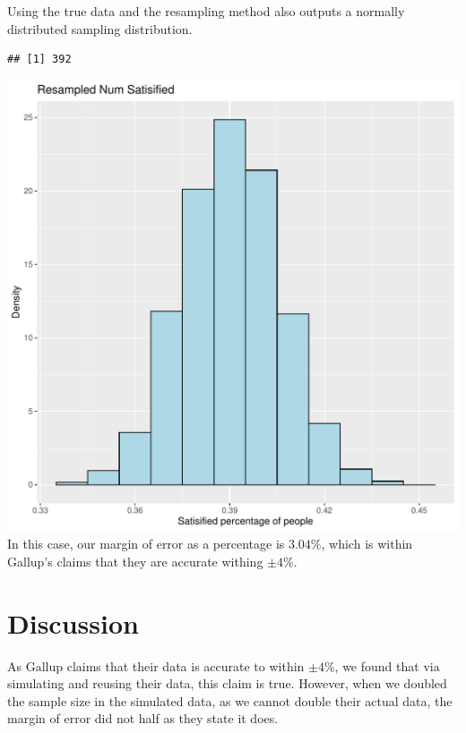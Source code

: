 \documentclass{article}\usepackage[]{graphicx}\usepackage[]{xcolor}
\makeatletter
\def\maxwidth{ %
  \ifdim\Gin@nat@width>\linewidth
    \linewidth
  \else
    \Gin@nat@width
  \fi
}
\newenvironment{kframe}{%
 \def\at@end@of@kframe{}%
 \ifinner\ifhmode%
  \def\at@end@of@kframe{\end{minipage}}%
  \begin{minipage}{\columnwidth}%
 \fi\fi%
 \def\FrameCommand##1{\hskip\@totalleftmargin \hskip-\fboxsep
 \colorbox{shadecolor}{##1}\hskip-\fboxsep
     \hskip-\linewidth \hskip-\@totalleftmargin \hskip\columnwidth}%
 \MakeFramed {\advance\hsize-\width
   \@totalleftmargin\z@ \linewidth\hsize
   \@setminipage}}%
 {\par\unskip\endMakeFramed%
 \at@end@of@kframe}
\newenvironment{knitrout}{}{} %
\makeatother
\begin{document}
\begin{multicols}{2}
Using the true data and the resampling method also outputs a normally distributed sampling distribution.
\begin{knitrout}\scriptsize
{}\color{fgcolor}\begin{kframe}
\begin{verbatim}
## [1] 392
\end{verbatim}
\end{kframe}
\includegraphics[width=\maxwidth]{figure/unnamed-chunk-2-1} 
\end{knitrout}
In this case, our margin of error as a percentage is $3.04\%$, which is within Gallup's claims that they are accurate withing $\pm 4\%$. 


\section{Discussion}
As Gallup claims that their data is accurate to within $\pm 4\%$, we found that via simulating and reusing their data, this claim is true. However, when we doubled the sample size in the simulated data, as we cannot double their actual data, the margin of error did not half as they state it does. 

\vspace{2em}



\begin{tiny}

\end{tiny}
\end{multicols}
\end{document}
